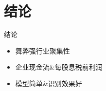 \section{结论}

\begin{frame}{结论}
    \begin{itemize}
        \item 舞弊强行业聚集性
        \item 企业现金流\&每股息税前利润
        \item 模型简单\&识别效果好
    \end{itemize}
\end{frame}
